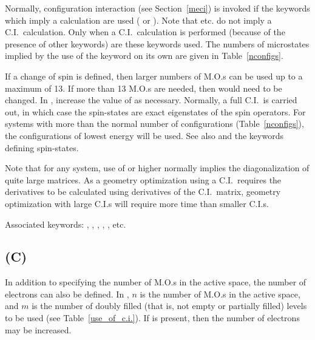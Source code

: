 Normally, configuration interaction (see Section~\ref{meci}) is  invoked if
the keywords which imply a  calculation are used ( or
). Note that  etc. do not imply
a  C.I.\ calculation.  Only when a C.I.\ calculation is performed (because of the
presence of other keywords) are these keywords used. The numbers  of
microstates  implied by the use of the  keyword  on its own are
given in Table~\ref{nconfigs}.

If a change of spin is defined, then larger numbers of M.O.s can be used  up
to a maximum of 13. If more than 13 M.O.s are needed, then  would
need to be changed.  In , increase the value of  as
necessary. Normally, a full C.I.\ is carried out, in which case the
spin-states  are exact  eigenstates of the spin operators.  For systems with
more than the normal number of configurations (Table~\ref{nconfigs}), the
configurations  of lowest energy  will be used.   See also and
the keywords defining spin-states.

Note that for any system, use of  or higher  normally  implies
the  diagonalization  of quite large matrices.  As a geometry optimization
using a C.I.\ requires the derivatives to be calculated using  derivatives of
the C.I.\ matrix, geometry optimization with large C.I.s will require more time
than smaller C.I.s.

Associated keywords:  , , , , ,
etc.

\subsection*{ (C)}
In addition to specifying the number of M.O.s in the active  space, the
number  of  electrons  can also be defined.  In , $n$ is
the number of M.O.s in the active space, and $m$ is the number of doubly filled
(that is, not empty or partially filled) levels to be used (see
Table~\ref{use_of_c.i.}).  If  is present, then the number
of electrons may be increased.

